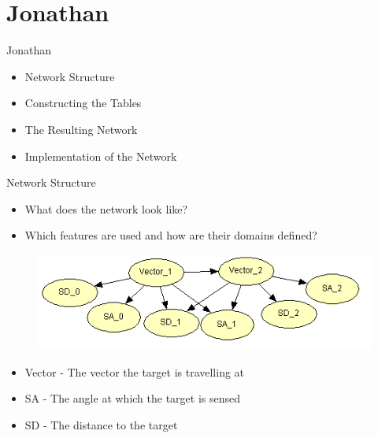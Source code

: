 \section{Jonathan}
\begin{frame}{Jonathan}
\begin{itemize}
\item Network Structure
\item Constructing the Tables
\item The Resulting Network
\item Implementation of the Network
\end{itemize}
\end{frame}


\begin{frame}{Network Structure}
\begin{itemize}
\item What does the network look like?
\item Which features are used and how are their domains defined?
\end{itemize}

\begin{figure}
  \includegraphics[scale=0.8]{figures/BNDone.PNG}
\end{figure}

\begin{itemize}
  \item Vector - The vector the target is travelling at
  \item SA - The angle at which the target is sensed
  \item SD - The distance to the target
\end{itemize}
\end{frame}

